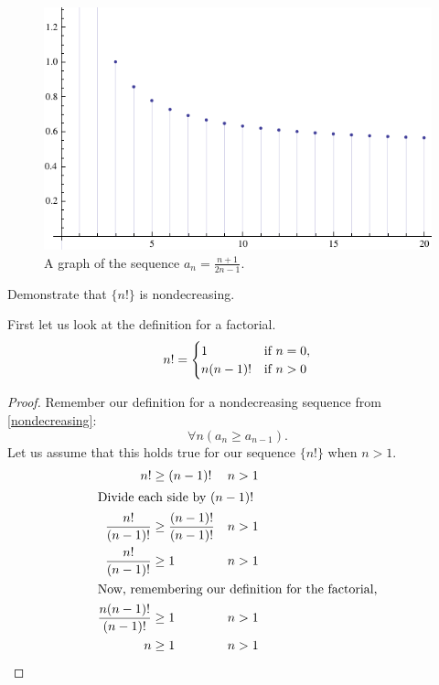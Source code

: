 \begin{ex}
\begin{figure}[H]
      \begin{center}
        \includegraphics{graphs/np22nm1.pdf}
      \end{center}
      \caption{A graph of the sequence $ a_n=\frac{n+1}{2n-1} $.}
    \end{figure}
\end{ex}
\begin{ex}
  Demonstrate that $\{n!\}$ is nondecreasing.
  \begin{sol}
    First let us look at the definition for a factorial.
    \begin{equation}\label{eq:factorial}\index{factorial}
      n! =
      \begin{cases}
        1 & \text{if } n = 0, \\
        n(n-1)! & \text{if } n > 0
      \end{cases}
    \end{equation}
    \begin{proof}
      Remember our definition for a nondecreasing sequence from \ref{nondecreasing}:
      \[\forall n (a_n \geq a_{n-1})\text{.}\]
      Let us assume that this holds true for our sequence $\{n!\}$ when $n>1$.
      \begin{align*}
        n!&\geq(n-1)!& n&>1 \\
        \intertext{Divide each side by $(n-1)!$}
        \frac{n!}{(n-1)!}&\geq \frac{(n-1)!}{(n-1)!} &n&>1 \\
        \frac{n!}{(n-1)!}&\geq 1 &n&>1 \\
        \intertext{Now, remembering our definition for the factorial,}
        \frac{n(n-1)!}{(n-1)!}&\geq 1 &n&>1 \\
        n&\geq1 &n&>1\qedhere
      \end{align*}
    \end{proof}
  \end{sol}
\end{ex}
